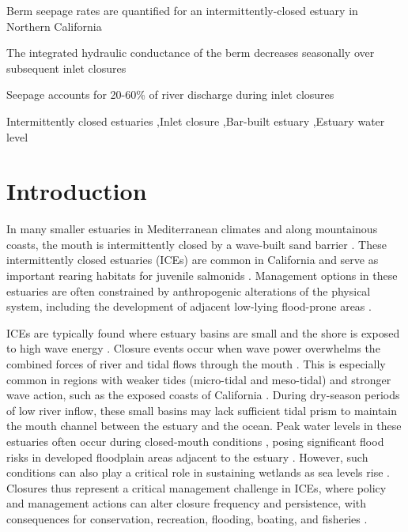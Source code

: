 \documentclass[preprint,12pt,authoryear]{elsarticle}
\begin{document}
\begin{frontmatter}
\begin{highlights}
\item Berm seepage rates are quantified for an  intermittently-closed estuary in Northern California
\item The integrated hydraulic conductance of the berm decreases seasonally over subsequent inlet closures
\item Seepage accounts for 20-60\% of river discharge during inlet closures
\end{highlights}

\begin{keyword}
Intermittently closed estuaries \sep  Inlet closure \sep  Bar-built estuary \sep  Estuary water level
\end{keyword}

\end{frontmatter}

\section{Introduction}
\label{sec:intro}

In many smaller estuaries in Mediterranean climates and along mountainous coasts, the mouth is intermittently closed by a wave-built sand barrier \citep{mcsweeney2017intermittently, largier2023recognizing}.
These intermittently closed estuaries (ICEs) are common in California
\citep{heady2015assessing} and serve as important rearing habitats for juvenile salmonids \citep{bond2008marine, heady2015assessing, huber2020environmental}. Management options in these estuaries are often constrained by anthropogenic alterations of the physical system, including the development of adjacent low-lying flood-prone areas \citep{largier2019considerations}.

ICEs are typically found where estuary basins are small and the shore is exposed to high wave energy \citep{cooper2001geomorphological}. Closure events occur when wave power overwhelms the combined forces of river and tidal flows through the mouth \citep{behrens2013episodic, behrens2015quantified}.  This  is especially common in regions with weaker tides (micro-tidal and meso-tidal) and stronger wave action, such as the exposed coasts of California
\citep{mcsweeney2017intermittently}.
During dry-season periods of low river inflow, these small basins may lack sufficient tidal prism to maintain the mouth channel between the estuary and the ocean.
Peak water levels in these estuaries often occur during closed-mouth conditions \citep{booysen2020methods}, posing significant flood risks in developed floodplain areas adjacent to the estuary \citep{clark2019systematic}. However, such conditions can also play a critical role in sustaining wetlands as sea levels rise \citep{thorne2021wetlands}. Closures thus represent a critical management challenge in ICEs, where policy and management actions can alter closure frequency and persistence, with consequences for conservation, recreation, flooding, boating, and fisheries \citep{stein2021advancing}.
\end{document}
